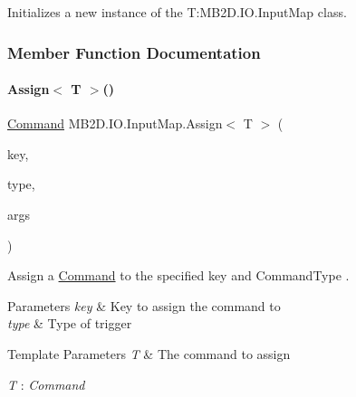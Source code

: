 Initializes a new instance of the T\+:\+M\+B2\+D.\+I\+O.\+Input\+Map class. 



\subsubsection{Member Function Documentation}
\hypertarget{class_m_b2_d_1_1_i_o_1_1_input_map_a07131c13b291c957512c08aa0d814890}{}\label{class_m_b2_d_1_1_i_o_1_1_input_map_a07131c13b291c957512c08aa0d814890} 
\paragraph{\texorpdfstring{Assign$<$ T $>$()}{Assign< T >()}}
{\footnotesize\ttfamily \hyperlink{class_m_b2_d_1_1_i_o_1_1_command}{Command} M\+B2\+D.\+I\+O.\+Input\+Map.\+Assign$<$ T $>$ (\begin{DoxyParamCaption}\item[{Keys}]{key,  }\item[{\hyperlink{namespace_m_b2_d_1_1_i_o_ab5f95f3fe9e652778b62bdf943168a68}{Command\+Type}}]{type,  }\item[{params object \mbox{[}$\,$\mbox{]}}]{args }\end{DoxyParamCaption})\hspace{0.3cm}{\ttfamily [inline]}}



Assign a \hyperlink{class_m_b2_d_1_1_i_o_1_1_command}{Command} to the specified key and Command\+Type . 


\begin{DoxyParams}{Parameters}
{\em key} & Key to assign the command to\\
\hline
{\em type} & Type of trigger\\
\hline
\end{DoxyParams}

\begin{DoxyTemplParams}{Template Parameters}
{\em T} & The command to assign\\
\hline
\end{DoxyTemplParams}
\begin{Desc}
\item[Type Constraints]\begin{description}
\item[{\em T} : {\em Command}]\end{description}
\end{Desc}
\hypertarget{class_m_b2_d_1_1_i_o_1_1_input_map_ae5537db7c751ba05196cc71d5f98bf87}{}\label{class_m_b2_d_1_1_i_o_1_1_input_map_ae5537db7c751ba05196cc71d5f98bf87} 
